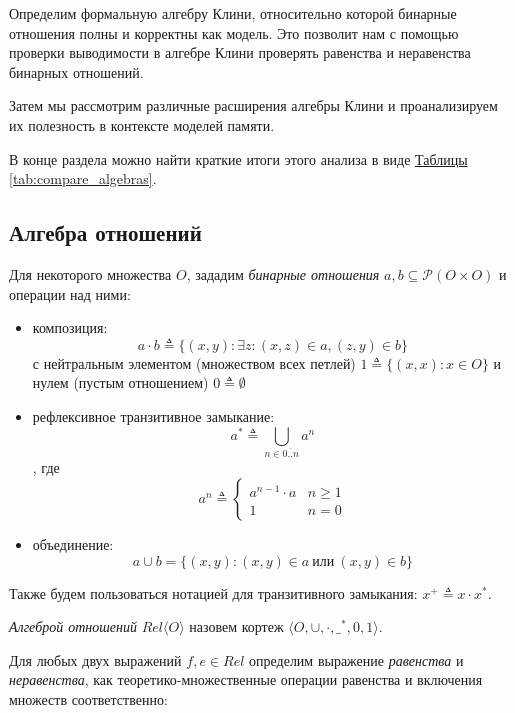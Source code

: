 \documentclass[times
              ,specification
              ,annotation
              ]{itmo-student-thesis}
\begin{document}
    Определим формальную алгебру Клини, относительно которой бинарные отношения полны и корректны как модель.
    Это позволит нам с помощью проверки выводимости в алгебре Клини проверять равенства и неравенства бинарных отношений.

    Затем мы рассмотрим различные расширения алгебры Клини и проанализируем их полезность в контексте
    моделей памяти.

    В конце раздела можно найти краткие итоги этого анализа в виде
    \hyperref[tab:compare_algebras]{Таблицы \ref{tab:compare_algebras}}.

    \subsection{Алгебра отношений}
      Для некоторого множества $ O $, зададим \textit{бинарные отношения}
      $ a, b \subseteq \mathcal{P}(O \times O) $
      и операции над ними:
      \begin{itemize}
        \item композиция:
         $$a \cdot b \triangleq \{ (x, y) : \exists z : (x, z) \in a, (z, y) \in b \} $$
        с нейтральным элементом (множеством всех петлей) $ 1 \triangleq \{(x, x) : x \in O\} $
        и нулем (пустым отношением) $ 0 \triangleq \emptyset $
        \item рефлексивное транзитивное замыкание:
        $$ a^* \triangleq \bigcup\limits_{n \in \overline{0..n}} a^n $$,
       где
       \begin{equation*}
        a^n \triangleq \begin{cases}
          a^{n-1} \cdot a & n \ge 1\\
          1          & n = 0
        \end{cases}
       \end{equation*}
       \item объединение:
       $$ a \cup b = \{(x, y) : (x, y) \in a ~\text{или}~ (x, y) \in b   \} $$

      \end{itemize}
      Также будем пользоваться нотацией для транзитивного замыкания: $ x^+ \triangleq x \cdot x^*$.

      \textit{Алгеброй отношений} $\mathit{Rel}\langle O \rangle$
      назовем кортеж  $\langle O, \cup, \cdot, \_^* , 0, 1\rangle $.

      Для любых двух выражений $ f, e \in \mathit{Rel}$ определим выражение \textit{равенства} и
      \textit{неравенства}, как теоретико-множественные операции равенства и включения множеств
      соответственно:
\end{document}
